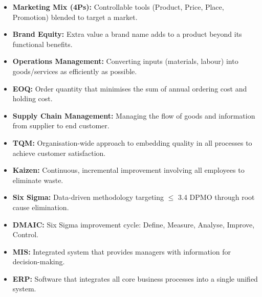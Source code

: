 \documentclass[12pt,a4paper]{article}
\begin{document}
\begin{tcolorbox}[defbox, title={\textbf{One-Line Definitions}}]
\begin{itemize}[leftmargin=*, itemsep=2pt, topsep=0pt]
  \item \textbf{Marketing Mix (4Ps):} Controllable tools (Product, Price, Place, Promotion) blended to target a market.
  \item \textbf{Brand Equity:} Extra value a brand name adds to a product beyond its functional benefits.
  \item \textbf{Operations Management:} Converting inputs (materials, labour) into goods/services as efficiently as possible.
  \item \textbf{EOQ:} Order quantity that minimises the sum of annual ordering cost and holding cost.
  \item \textbf{Supply Chain Management:} Managing the flow of goods and information from supplier to end customer.
  \item \textbf{TQM:} Organisation-wide approach to embedding quality in all processes to achieve customer satisfaction.
  \item \textbf{Kaizen:} Continuous, incremental improvement involving all employees to eliminate waste.
  \item \textbf{Six Sigma:} Data-driven methodology targeting $\leq$ 3.4 DPMO through root cause elimination.
  \item \textbf{DMAIC:} Six Sigma improvement cycle: Define, Measure, Analyse, Improve, Control.
  \item \textbf{MIS:} Integrated system that provides managers with information for decision-making.
  \item \textbf{ERP:} Software that integrates all core business processes into a single unified system.
\end{itemize}
\end{tcolorbox}
\end{document}
